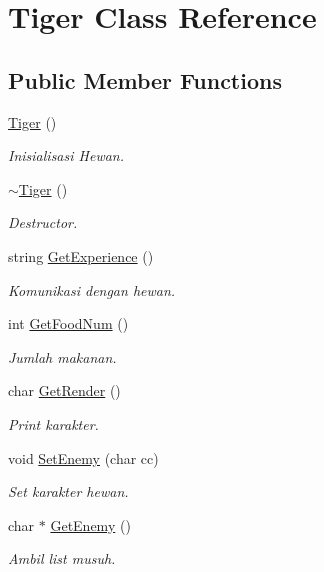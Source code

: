 \hypertarget{class_tiger}{}\section{Tiger Class Reference}
\label{class_tiger}
\subsection*{Public Member Functions}
\begin{DoxyCompactItemize}
\item 
\hyperlink{class_tiger_ab2b455a0cdbd21f2052eef2a176f0eeb}{Tiger} ()\hypertarget{class_tiger_ab2b455a0cdbd21f2052eef2a176f0eeb}{}\label{class_tiger_ab2b455a0cdbd21f2052eef2a176f0eeb}

\begin{DoxyCompactList}\small\item\em Inisialisasi Hewan. \end{DoxyCompactList}\item 
\hyperlink{class_tiger_acb6310bff243b1d14ea8f783a22c62b4}{$\sim$\+Tiger} ()\hypertarget{class_tiger_acb6310bff243b1d14ea8f783a22c62b4}{}\label{class_tiger_acb6310bff243b1d14ea8f783a22c62b4}

\begin{DoxyCompactList}\small\item\em Destructor. \end{DoxyCompactList}\item 
string \hyperlink{class_tiger_acd585f0b4c5388b87626e0d0a8434daa}{Get\+Experience} ()\hypertarget{class_tiger_acd585f0b4c5388b87626e0d0a8434daa}{}\label{class_tiger_acd585f0b4c5388b87626e0d0a8434daa}

\begin{DoxyCompactList}\small\item\em Komunikasi dengan hewan. \end{DoxyCompactList}\item 
int \hyperlink{class_tiger_a71039b4cfa967f7c2060e7c4b198e033}{Get\+Food\+Num} ()
\begin{DoxyCompactList}\small\item\em Jumlah makanan. \end{DoxyCompactList}\item 
char \hyperlink{class_tiger_a8a6d245d21eb4407c299189ca1c52e1b}{Get\+Render} ()
\begin{DoxyCompactList}\small\item\em Print karakter. \end{DoxyCompactList}\item 
void \hyperlink{class_tiger_aeee182899a035f0471c761fa073e19f9}{Set\+Enemy} (char cc)
\begin{DoxyCompactList}\small\item\em Set karakter hewan. \end{DoxyCompactList}\item 
char $\ast$ \hyperlink{class_tiger_a053a83818fe6415121e01d726a04dbd5}{Get\+Enemy} ()
\begin{DoxyCompactList}\small\item\em Ambil list musuh. \end{DoxyCompactList}\end{DoxyCompactItemize}
